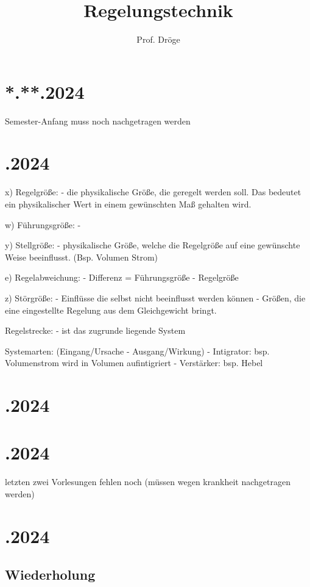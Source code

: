 \documentclass{article}
\title{Regelungstechnik}
\author{Prof. Dröge}
\date{}
\begin{document}
\maketitle

\newpage
\section*{\centering **.**.2024}
Semester-Anfang muss noch nachgetragen werden

\newpage
 \section*{.2024}

  x) Regelgröße:
  - die physikalische Größe, die geregelt werden soll. Das bedeutet ein physikalischer Wert in einem gewünschten Maß gehalten wird.

  w) Führungsgröße:
  -

  y) Stellgröße:
  - physikalische Größe, welche die Regelgröße auf eine gewünschte Weise beeinflusst. (Bsp. Volumen Strom)

  e) Regelabweichung:
  - Differenz = Führungsgröße - Regelgröße

  z) Störgröße:
  - Einflüsse die selbst nicht beeinflusst werden können
  - Größen, die eine eingestellte Regelung aus dem Gleichgewicht bringt.

  Regelstrecke:
  - ist das zugrunde liegende System

  Systemarten: (Eingang/Ursache - Ausgang/Wirkung)
  - Intigrator: bsp. Volumenstrom wird in Volumen aufintigriert
  - Verstärker: bsp. Hebel

\newpage
\section*{.2024}
\section*{.2024}
letzten zwei Vorlesungen fehlen noch (müssen wegen krankheit nachgetragen werden)

\newpage
\section*{.2024}
\subsection*{Wiederholung}
\end{document}
